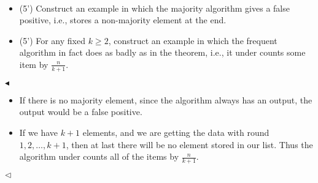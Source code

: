 \documentclass[11pt]{article}
\newenvironment{problem}[2][Problem]{\begin{trivlist}
\item[\hskip \labelsep {\bfseries #1}\hskip \labelsep {\bfseries #2.}]}{\hfill$\blacktriangleleft$\end{trivlist}}
\newenvironment{answer}[1][Answer]{\begin{trivlist}
\item[\hskip \labelsep {\bfseries #1.}\hskip \labelsep]}{\hfill$\lhd$\end{trivlist}}
\begin{document}
\begin{problem}{4 (10')}~
\begin{itemize}
    \item [(1)] (5') Construct an example in which the majority algorithm gives a false positive, i.e., stores a non-majority element at the end.
    \item [(2)] (5') For any fixed $k \geq 2$, construct an example in which the frequent algorithm in fact does as badly as in the theorem, i.e., it under counts some item by $\frac{n}{k+1}$.
\end{itemize}
\end{problem}
\begin{answer}
\begin{itemize}
    \item [(1)]  If there is no majority element, since the algorithm always has an output, the output would be a false positive.
    \item [(2)] If we have $k + 1$ elements, and we are getting the data with round $1, 2, \dots, k + 1$, then at last there will be no element stored in our list. Thus the algorithm under counts all of the items by $\frac{n}{k+1}$.
\end{itemize}
\end{answer}
\end{document}

